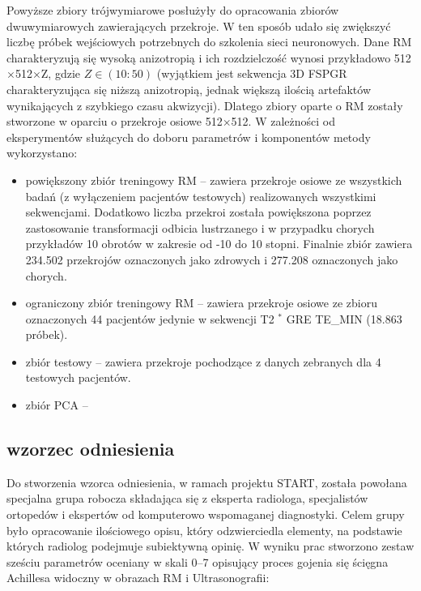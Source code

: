 Powyższe zbiory trójwymiarowe posłużyły do opracowania zbiorów dwuwymiarowych zawierających przekroje. W ten sposób udało się zwiększyć liczbę próbek wejściowych potrzebnych do szkolenia sieci neuronowych. Dane RM charakteryzują się wysoką anizotropią i ich rozdzielczość wynosi przykładowo 512$\times$512$\times$Z, gdzie $Z\in(10:50)$ (wyjątkiem jest sekwencja 3D FSPGR charakteryzująca się niższą anizotropią, jednak większą ilością artefaktów wynikających z szybkiego czasu akwizycji). Dlatego zbiory oparte o RM zostały stworzone w oparciu o przekroje osiowe 512$\times$512. W zależności od eksperymentów służących do doboru parametrów i komponentów metody wykorzystano:
\begin{itemize}
	\item powiększony zbiór treningowy RM -- zawiera przekroje osiowe ze wszystkich badań (z wyłączeniem pacjentów testowych) realizowanych wszystkimi sekwencjami. Dodatkowo liczba przekroi została powiększona poprzez zastosowanie transformacji odbicia lustrzanego i w przypadku chorych przykładów 10 obrotów w zakresie od -10 do 10 stopni. Finalnie zbiór zawiera 234.502 przekrojów oznaczonych jako zdrowych i 277.208 oznaczonych jako chorych.
	\item ograniczony zbiór treningowy RM -- zawiera przekroje osiowe ze zbioru oznaczonych 44 pacjentów jedynie w sekwencji T2 $^\ast$ GRE TE\_MIN (18.863 próbek).
	\item zbiór testowy -- zawiera przekroje pochodzące z danych zebranych dla 4 testowych pacjentów.
	\item zbiór PCA --
\end{itemize}


 

\subsection{wzorzec odniesienia}

Do stworzenia wzorca odniesienia, w ramach projektu START, została powołana specjalna grupa robocza składająca się z eksperta radiologa, specjalistów ortopedów i ekspertów od komputerowo wspomaganej diagnostyki. Celem grupy było opracowanie ilościowego opisu, który odzwierciedla elementy, na podstawie których radiolog podejmuje subiektywną opinię. W wyniku prac stworzono zestaw sześciu parametrów oceniany w skali 0--7 opisujący proces gojenia się ścięgna Achillesa widoczny w obrazach RM i Ultrasonografii:

